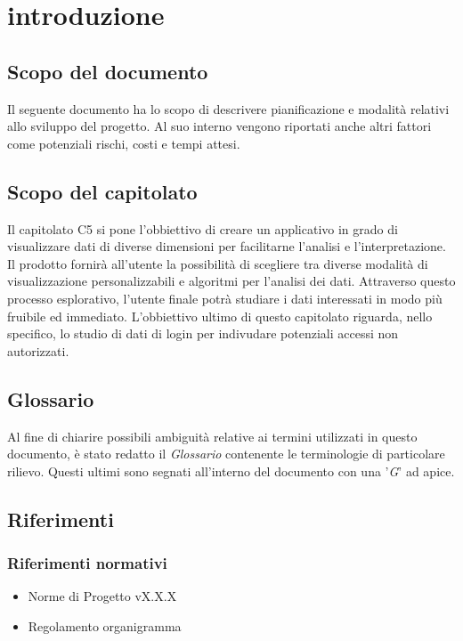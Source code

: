 \section{introduzione}
\subsection{Scopo del documento}
Il seguente documento ha lo scopo di descrivere pianificazione e modalità relativi allo sviluppo del progetto.
Al suo interno vengono riportati anche altri fattori come potenziali rischi, costi e tempi attesi.

\subsection{Scopo del capitolato}
Il capitolato C5 si pone l'obbiettivo di creare un applicativo in grado di visualizzare dati di diverse dimensioni 
per facilitarne l'analisi e l'interpretazione. Il prodotto fornirà all'utente la possibilità di scegliere tra diverse
modalità di visualizzazione personalizzabili e algoritmi per l'analisi dei dati. Attraverso questo processo esplorativo,
l'utente finale potrà studiare i dati interessati in modo più fruibile ed immediato. L'obbiettivo ultimo di questo capitolato riguarda, nello specifico, lo studio di dati di login per indivudare
potenziali accessi non autorizzati.

\subsection{Glossario}
Al fine di chiarire possibili ambiguità relative ai termini utilizzati in questo documento, è stato redatto il \textit{Glossario} contenente le terminologie di particolare rilievo.
Questi ultimi sono segnati all'interno del documento con una '\textit{G}' ad apice. 

\subsection{Riferimenti}
\subsubsection{Riferimenti normativi}
\begin{itemize}
    \item Norme di Progetto vX.X.X
    \item Regolamento organigramma
\end{itemize}
